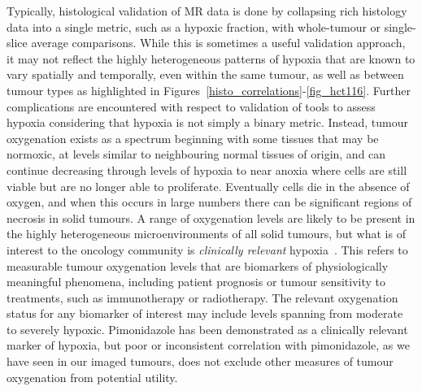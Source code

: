 {Typically, histological validation of MR data is done by collapsing rich histology data into a single metric, such as a hypoxic fraction, with whole-tumour or single-slice average comparisons.
While this is sometimes a useful validation approach, it may not reflect the highly heterogeneous patterns of hypoxia that are known to vary spatially and temporally, even within the same tumour, as well as between tumour types as highlighted in Figures~\ref{histo_correlations}-\ref{fig_hct116}. 
Further complications are encountered with respect to validation of tools to assess hypoxia considering that hypoxia is not simply a binary metric. Instead, tumour oxygenation exists as a spectrum beginning with some tissues that may be normoxic, at levels similar to neighbouring normal tissues of origin, and can continue decreasing through levels of hypoxia to near anoxia where cells are still viable but are no longer able to proliferate.
Eventually cells die in the absence of oxygen, and when this occurs in large numbers there can be significant regions of necrosis in solid tumours. 
A range of oxygenation levels are likely to be present in the highly heterogeneous microenvironments of all solid tumours, but what is of interest to the oncology community is \emph{clinically relevant} hypoxia~\cite{Horsman:2012kw}.
This refers to measurable tumour oxygenation levels that are biomarkers of physiologically meaningful phenomena, including patient prognosis or tumour sensitivity to treatments, such as immunotherapy or radiotherapy. The relevant oxygenation status for any biomarker of interest may include levels spanning from moderate to severely hypoxic. 
Pimonidazole has been demonstrated as a clinically relevant marker of hypoxia, but poor or inconsistent correlation with pimonidazole, as we have seen in our imaged tumours, does not exclude other measures of tumour oxygenation from potential utility.

}
